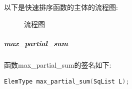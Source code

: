 \documentclass[supercite]{Experimental_Report}
\theoremstyle{definition}
\begin{document}
\newpage
\noindent
以下是快速排序函数的主体的流程图:
\begin{figure}[htbp]
	\centering
	\centering
	\caption{流程图}
	\label{fig6-2}
\end{figure}

\subparagraph{max\_partial\_sum}
\noindent
函数max\_partial\_sum的签名如下:
\begin{lstlisting}[language=C++, frame=single]
ElemType max_partial_sum(SqList L);
\end{lstlisting}
\end{document}
